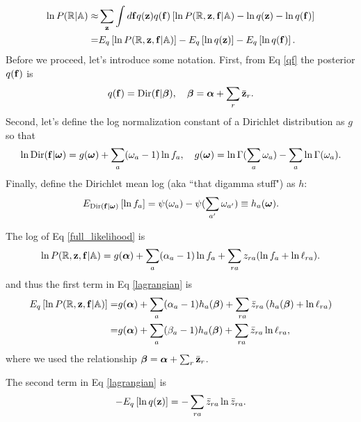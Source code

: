 \documentclass[nofootinbib,amssymb,amsmath]{revtex4}
\newcommand{\vf}{{\bf f}}
\newcommand{\vz}{{\bf z}}
\newcommand{\valpha}{{\bm{\alpha}}}
\newcommand{\vbeta}{{\bm{\beta}}}
\newcommand{\vomega}{{\bm{\omega}}}
\begin{document}
\begin{align}
\ln P(\mathbb{R} | \mathbb{A}) \approx& \sum_{\vz} \int d \vf q(\vz) q(\vf) \left[ \ln P(\mathbb{R}, \vz, \vf | \mathbb{A}) - \ln q(\vz) - \ln q(\vf) \right] \\
=& E_q \left[ \ln P(\mathbb{R}, \vz, \vf | \mathbb{A}) \right] - E_q \left[ \ln q(\vz) \right] - E_q \left[ \ln q(\vf) \right]. \label{lagrangian}
\end{align}
Before we proceed, let's introduce some notation.  First, from Eq \ref{qf} the posterior $q(\vf)$ is
\begin{equation}
q(\vf) = {\rm Dir}(\vf | \vbeta), \quad \vbeta = \valpha + \sum_r \bar{\vz}_r.
\end{equation}
Second, let's define the log normalization constant of a Dirichlet distribution as $g$ so that
\begin{equation}
\ln {\rm Dir}(\vf | \vomega) = g(\vomega) + \sum_a (\omega_a - 1) \ln f_a, \quad g(\vomega) = \ln \Gamma(\sum_a \omega_a) - \sum_a \ln \Gamma(\omega_a).
\end{equation}
Finally, define the Dirichlet mean log (aka ``that digamma stuff") as $h$:
\begin{equation}
E_{\rm Dir(\vf | \vomega)} \left[ \ln f_a \right] = \psi(\omega_a) - \psi(\sum_{a^\prime} \omega_{a^\prime}) \equiv h_a(\vomega).
\end{equation}

The log of Eq \ref{full_likelihood} is
\begin{equation}
\ln P(\mathbb{R}, \vz, \vf | \mathbb{A}) = g(\valpha) + \sum_a (\alpha_a - 1) \ln f_a + \sum_{ra} z_{ra} (\ln f_a + \ln \ell_{ra}).
\end{equation}
and thus the first term in Eq \ref{lagrangian} is
\begin{align}
E_q \left[ \ln P(\mathbb{R}, \vz, \vf | \mathbb{A}) \right] =& g(\valpha) + \sum_a (\alpha_a - 1) h_a(\vbeta) + \sum_{ra}\bar{z}_{ra} \left( h_a(\vbeta) + \ln \ell_{ra} \right) \\
=& g(\valpha) + \sum_a (\beta_a - 1) h_a(\vbeta) + \sum_{ra}\bar{z}_{ra} \ln \ell_{ra}, \label{first_term}
\end{align}
where we used the relationship $\vbeta = \valpha + \sum_r \bar{\vz}_r$.

The second term in Eq \ref{lagrangian} is
\begin{align}
- E_q \left[ \ln q(\vz) \right] = - \sum_{ra} \bar{z}_{ra} \ln \bar{z}_{ra} \label{second_term}.
\end{align}
\end{document}
